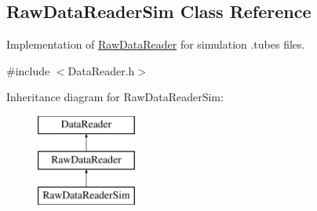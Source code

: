 \hypertarget{classRawDataReaderSim}{
\subsection{RawDataReaderSim Class Reference}
\label{classRawDataReaderSim}
}


Implementation of \hyperlink{classRawDataReader}{RawDataReader} for simulation .tubes files.  




{\ttfamily \#include $<$DataReader.h$>$}

Inheritance diagram for RawDataReaderSim:\begin{figure}[H]
\begin{center}
\leavevmode
\includegraphics[height=3.000000cm]{classRawDataReaderSim}
\end{center}
\end{figure}
